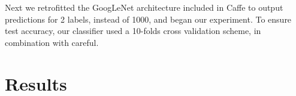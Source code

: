 \documentclass[midd]{thesis}
\begin{document}
Next we retrofitted the GoogLeNet architecture included in Caffe to output predictions for 2 labels, instead of 1000, and began our experiment. To ensure test accuracy, our classifier used a 10-folds cross validation scheme, in combination with careful.

\chapter{Results}



\end{document}
